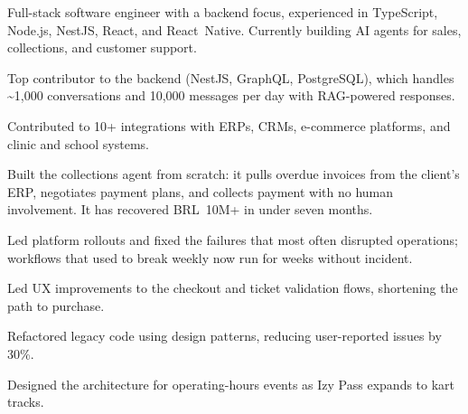\documentclass{resume}
\begin{document}


Full-stack software engineer with a backend focus, experienced in TypeScript, Node.js, NestJS, React, and React~Native. Currently building AI agents for sales, collections, and customer support.


\begin{bullets}
  \item Top contributor to the backend (NestJS, GraphQL, PostgreSQL), which handles \textasciitilde 1,000 conversations and 10,000 messages per day with RAG-powered responses.
  \item Contributed to 10+ integrations with ERPs, CRMs, e-commerce platforms, and clinic and school systems.
  \item Built the collections agent from scratch: it pulls overdue invoices from the client's ERP, negotiates payment plans, and collects payment with no human involvement. It has recovered BRL~10M+ in under seven months.
  \item Led platform rollouts and fixed the failures that most often disrupted operations; workflows that used to break weekly now run for weeks without incident.
\end{bullets}

\begin{bullets}
  \item Led UX improvements to the checkout and ticket validation flows, shortening the path to purchase.
  \item Refactored legacy code using design patterns, reducing user-reported issues by 30\%.
  \item Designed the architecture for operating-hours events as Izy Pass expands to kart tracks.
\end{bullets}
\end{document}
